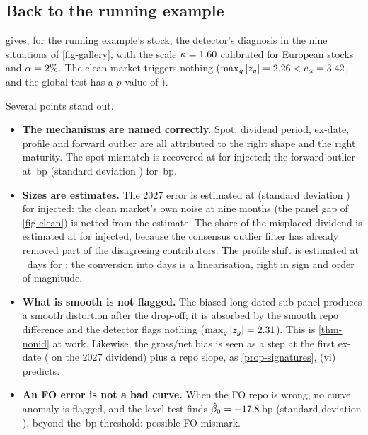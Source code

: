 \subsection{Back to the running example}\label{sec-back}
\begin{filrouge}
 gives, for the running example's stock, the detector's diagnosis in the nine situations of
\cref{fig-gallery}, with the scale $\kappa=\num{1.60}$ calibrated for European stocks and $\alpha=\pct{2}$. The clean
market triggers nothing ($\max_g|z_g|=\num{2.26}<c_\alpha=\num{3.42}$, and the global test has a $p$-value of \vRunChiP).
\end{filrouge}

\begin{table}[ht]
\centering
\caption{Running example: what is injected and what the detector says. $z$ is statistic \eqref{eq-z} of the first
selected shape; sizes are translated into natural units (\cref{tab-templates}).}
\label{tab-running}

\end{table}

Several points stand out.
\begin{itemize}
\item \textbf{The mechanisms are named correctly.} Spot, dividend period, ex-date, profile and forward outlier are all
attributed to the right shape and the right maturity. The spot mismatch is recovered at \vRunSpotEst{} for
\vRunSpotEps{} injected; the forward outlier at \vRunFwdEst\,bp (standard deviation \vRunFwdSe) for \vRunFwdShift\,bp.
\item \textbf{Sizes are estimates.} The 2027 error is estimated at \vRunBucketEst{} (standard deviation
\vRunBucketSe) for \vRunBucketDelta{} injected: the clean market's own noise at nine months (the panel gap of
\cref{fig-clean}) is netted from the estimate. The share of the misplaced dividend is estimated at \vRunTimingEst{} for
\vRunTimingShare{} injected, because the consensus outlier filter has already removed part of the disagreeing
contributors. The profile shift is estimated at \vRunSeasonEst~days for \vRunSeasonShift: the conversion into days is a
linearisation, right in sign and order of magnitude.
\item \textbf{What is smooth is not flagged.} The biased long-dated sub-panel produces a smooth distortion after the
\vRunPanelTenor{} drop-off; it is absorbed by the smooth repo difference and the detector flags nothing
($\max_g|z_g|=\num{2.31}$). This is \cref{thm-nonid} at work. Likewise, the gross/net bias is seen as a step at the
first ex-date (\vRunGrossEst{} on the 2027 dividend) plus a repo slope, as \cref{prop-signatures}, (vi) predicts.
\item \textbf{An FO error is not a bad curve.} When the FO repo is wrong, no curve anomaly is flagged, and the level test
finds $\hat\beta_0=\num{-17.8}$\,bp (standard deviation \vRunFoSe), beyond the \vRunFoThr\,bp threshold: possible FO
mismark.
\end{itemize}

